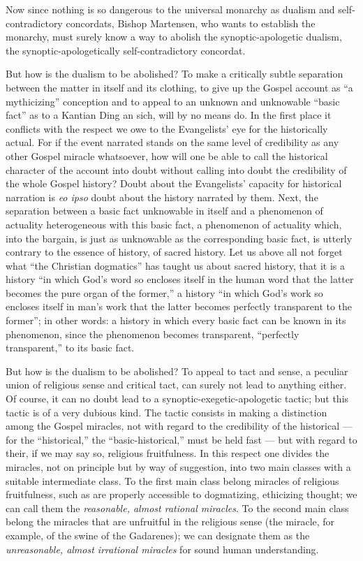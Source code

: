 \documentclass[12pt]{book}
\newcommand{\opage}[1]{\marginnote{\footnotesize\textit{[#1]}}}
\begin{document}
Now since nothing is so dangerous to the universal monarchy as dualism and self-contradictory concordats, Bishop Martensen, who wants to establish the monarchy, must surely know a way to abolish the synoptic-apologetic dualism, the synoptic-apologetically self-contradictory concordat.

But how is the dualism to be abolished? To make a critically subtle separation between the matter in itself and its clothing, to give up the Gospel account as ``a mythicizing'' conception and to appeal to an unknown and unknowable ``basic fact'' as to a Kantian Ding an sich, will by no means do. In the first place it conflicts with the respect we owe to the Evangelists' eye for the historically actual. For if the event narrated stands on the same level of credibility as any other Gospel miracle whatsoever, how will one be able to call the historical character of the account into doubt without calling into doubt the credibility of the whole Gospel history? Doubt about the Evangelists' capacity for historical narration is \textit{eo ipso} doubt about the history narrated by them. Next, the separation between a basic fact unknowable in itself and a phenomenon of actuality heterogeneous with this basic fact, a phenomenon of actuality which, into the bargain, is just as unknowable as the corresponding basic fact, is utterly contrary to the essence of history, of sacred history. Let us above all not forget what ``the Christian dogmatics'' has taught us about sacred history, that it is a history ``in which God's word so encloses itself in the human word that the latter becomes the pure organ of the former,'' a history ``in which God's work
\opage{74}\setcounter{footnote}{0}%
so encloses itself in man's work that the latter becomes perfectly transparent to the former''; in other words: a history in which every basic fact can be known in its phenomenon, since the phenomenon becomes transparent, ``perfectly transparent,'' to its basic fact.

But how is the dualism to be abolished? To appeal to tact and sense, a peculiar union of religious sense and critical tact, can surely not lead to anything either. Of course, it can no doubt lead to a synoptic-exegetic-apologetic tactic; but this tactic is of a very dubious kind. The tactic consists in making a distinction among the Gospel miracles, not with regard to the credibility of the historical --- for the ``historical,'' the ``basic-historical,'' must be held fast --- but with regard to their, if we may say so, religious fruitfulness. In this respect one divides the miracles, not on principle but by way of suggestion, into two main classes with a suitable intermediate class. To the first main class belong miracles of religious fruitfulness, such as are properly accessible to dogmatizing, ethicizing thought; we can call them the \emph{reasonable, almost rational miracles}. To the second main class belong the miracles that are unfruitful in the religious sense (the miracle, for example, of the swine of the Gadarenes); we can designate them as the \emph{unreasonable, almost irrational miracles} for sound human understanding.
\end{document}
